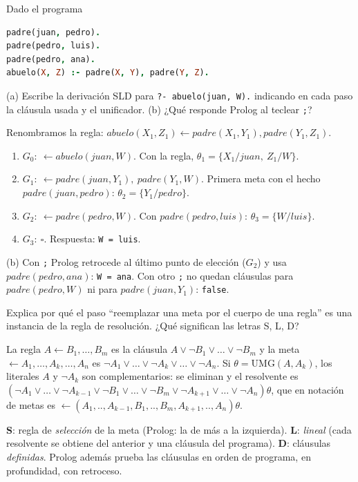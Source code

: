 \begin{prob}
Dado el programa
\begin{lstlisting}[language=Prolog]
padre(juan, pedro).
padre(pedro, luis).
padre(pedro, ana).
abuelo(X, Z) :- padre(X, Y), padre(Y, Z).
\end{lstlisting}
(a) Escribe la derivación SLD para \texttt{?- abuelo(juan, W).} indicando en cada paso la cláusula usada y el unificador. (b) ¿Qué responde Prolog al teclear \texttt{;}?
\end{prob}
\begin{sol}
Renombramos la regla: $abuelo(X_1,Z_1)\leftarrow padre(X_1,Y_1),padre(Y_1,Z_1)$.
\begin{enumerate}
\item $G_0:\ \leftarrow abuelo(juan,W)$. Con la regla, $\theta_1=\{X_1/juan,\ Z_1/W\}$.
\item $G_1:\ \leftarrow padre(juan,Y_1),\ padre(Y_1,W)$. Primera meta con el hecho $padre(juan,pedro)$: $\theta_2=\{Y_1/pedro\}$.
\item $G_2:\ \leftarrow padre(pedro,W)$. Con $padre(pedro,luis)$: $\theta_3=\{W/luis\}$.
\item $G_3:\ \square$. Respuesta: \texttt{W = luis}.
\end{enumerate}
(b) Con \texttt{;} Prolog retrocede al último punto de elección ($G_2$) y usa $padre(pedro,ana)$: \texttt{W = ana}. Con otro \texttt{;} no quedan cláusulas para $padre(pedro,W)$ ni para $padre(juan,Y_1)$: \texttt{false}.
\end{sol}

\begin{prob}
Explica por qué el paso ``reemplazar una meta por el cuerpo de una regla'' es una instancia de la regla de resolución. ¿Qué significan las letras S, L, D?
\end{prob}
\begin{sol}
La regla $A\leftarrow B_1,\dots,B_m$ es la cláusula $A\lor\neg B_1\lor\dots\lor\neg B_m$ y la meta $\leftarrow A_1,\dots,A_k,\dots,A_n$ es $\neg A_1\lor\dots\lor\neg A_k\lor\dots\lor\neg A_n$. Si $\theta=\mathrm{UMG}(A,A_k)$, los literales $A$ y $\neg A_k$ son complementarios: se eliminan y el resolvente es
$(\neg A_1\lor\dots\lor\neg A_{k-1}\lor\neg B_1\lor\dots\lor\neg B_m\lor\neg A_{k+1}\lor\dots\lor\neg A_n)\theta$, que en notación de metas es $\leftarrow(A_1,..,A_{k-1},B_1,..,B_m,A_{k+1},..,A_n)\theta$.

\textbf{S}: regla de \emph{selección} de la meta (Prolog: la de más a la izquierda). \textbf{L}: \emph{lineal} (cada resolvente se obtiene del anterior y una cláusula del programa). \textbf{D}: cláusulas \emph{definidas}. Prolog además prueba las cláusulas en orden de programa, en profundidad, con retroceso.
\end{sol}

